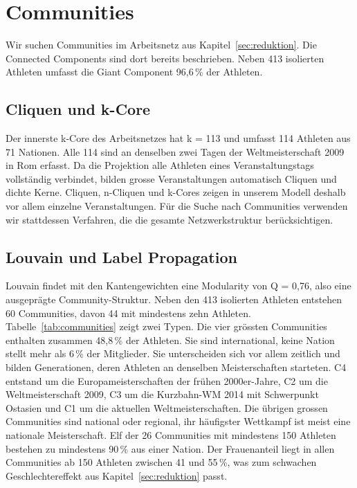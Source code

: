 \section{Communities}
\label{sec:communities}

Wir suchen Communities im Arbeitsnetz aus Kapitel~\ref{sec:reduktion}. Die
Connected Components sind dort bereits beschrieben. Neben 413 isolierten
Athleten umfasst die Giant Component 96,6\,\% der Athleten.

\subsection{Cliquen und k-Core}
Der innerste k-Core des Arbeitsnetzes hat k = 113 und umfasst 114 Athleten
aus 71 Nationen. Alle 114 sind an denselben zwei Tagen der Weltmeisterschaft
2009 in Rom erfasst. Da die Projektion alle Athleten eines Veranstaltungstags
vollständig verbindet, bilden grosse Veranstaltungen automatisch Cliquen und
dichte Kerne. Cliquen, n-Cliquen und k-Cores zeigen in unserem Modell
deshalb vor allem einzelne Veranstaltungen. Für die Suche nach Communities
verwenden wir stattdessen Verfahren, die die gesamte Netzwerkstruktur
berücksichtigen.

\subsection{Louvain und Label Propagation}
Louvain findet mit den Kantengewichten eine Modularity von Q = 0,76, also
eine ausgeprägte Community-Struktur. Neben den 413 isolierten Athleten
entstehen 60 Communities, davon 44 mit mindestens zehn Athleten.
Tabelle~\ref{tab:communities} zeigt zwei Typen. Die vier grössten
Communities enthalten zusammen 48,8\,\% der Athleten. Sie sind
international, keine Nation stellt mehr als 6\,\% der Mitglieder. Sie
unterscheiden sich vor allem zeitlich und bilden Generationen, deren
Athleten an denselben Meisterschaften starteten. C4 entstand um die
Europameisterschaften der frühen 2000er-Jahre, C2 um die Weltmeisterschaft
2009, C3 um die Kurzbahn-WM 2014 mit Schwerpunkt Ostasien und C1 um die
aktuellen Weltmeisterschaften. Die übrigen grossen Communities sind
national oder regional, ihr häufigster Wettkampf ist meist eine nationale
Meisterschaft. Elf der 26 Communities mit mindestens 150 Athleten bestehen
zu mindestens 90\,\% aus einer Nation. Der Frauenanteil liegt in allen
Communities ab 150 Athleten zwischen 41 und 55\,\%, was zum schwachen Geschlechtereffekt
aus Kapitel~\ref{sec:reduktion} passt.

